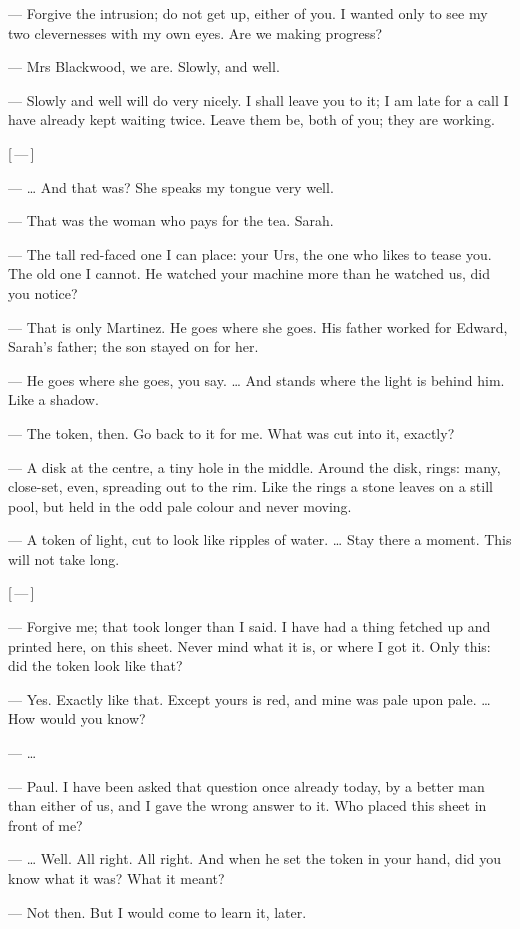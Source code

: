 \begin{room}

--- Forgive the intrusion; do not get up, either of you. I wanted only to see my two clevernesses with my own eyes. Are we making progress?

--- Mrs Blackwood, we are. Slowly, and well.

--- Slowly and well will do very nicely. I shall leave you to it; I am late for a call I have already kept waiting twice. Leave them be, both of you; they are working.

\centerline{[\,---\,]}

--- \ldots{} And that was? She speaks my tongue very well.

--- That was the woman who pays for the tea. Sarah.

--- The tall red-faced one I can place: your Urs, the one who likes to tease you. The old one I cannot. He watched your machine more than he watched us, did you notice?

--- That is only Martinez. He goes where she goes. His father worked for Edward, Sarah's father; the son stayed on for her.

--- He goes where she goes, you say. \ldots{} And stands where the light is behind him. Like a shadow.

--- The token, then. Go back to it for me. What was cut into it, exactly?

--- A disk at the centre, a tiny hole in the middle. Around the disk, rings: many, close-set, even, spreading out to the rim. Like the rings a stone leaves on a still pool, but held in the odd pale colour and never moving.

--- A token of light, cut to look like ripples of water. \ldots{} Stay there a moment. This will not take long.

\centerline{[\,---\,]}

--- Forgive me; that took longer than I said. I have had a thing fetched up and printed here, on this sheet. Never mind what it is, or where I got it. Only this: did the token look like that?

--- Yes. Exactly like that. Except yours is red, and mine was pale upon pale. \ldots{} How would you know?

--- \ldots{}

--- Paul. I have been asked that question once already today, by a better man than either of us, and I gave the wrong answer to it. Who placed this sheet in front of me?

--- \ldots{} Well. All right. All right. And when he set the token in your hand, did you know what it was? What it meant?

--- Not then. But I would come to learn it, later.

\end{room}

